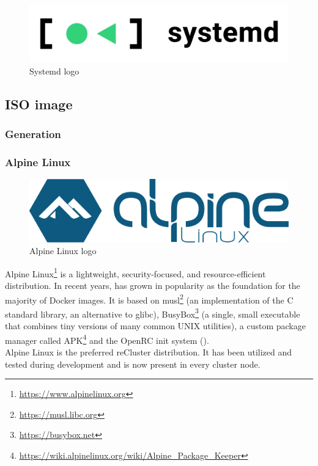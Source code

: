\begin{figure}
  \centering
  \includegraphics[width=.25\textwidth]{images/logos/systemd.png}
  \caption{Systemd logo}
\end{figure}

\subsection{ISO image}
\label{subsec:implementation_distributions_iso_image}

\subsubsection{Generation}
\label{subsubsec:implementation_distributions_iso_generation}

\subsubsection{Alpine Linux}
\label{subsubsec:implementation_distributions_iso_alpine_linux}

\begin{figure}
  \centering
  \includegraphics[width=.25\textwidth]{images/logos/alpine.png}
  \caption{Alpine Linux logo}
\end{figure}

Alpine Linux\footnote{\url{https://www.alpinelinux.org}} is a lightweight, security-focused,
and resource-efficient distribution. In recent years, has grown in popularity as
the foundation for the majority of Docker images. It is based on musl\footnote{\url{https://musl.libc.org}}
(an implementation of the C standard library, an alternative to glibc), BusyBox\footnote{\url{https://busybox.net}}
(a single, small executable that combines tiny versions of many common UNIX utilities),
a custom package manager called APK\footnote{\url{https://wiki.alpinelinux.org/wiki/Alpine_Package_Keeper}}
and the OpenRC init system ()\cite{alpine_linux}. \\ %
Alpine Linux is the preferred reCluster distribution. It has been utilized and
tested during development and is now present in every cluster node.

